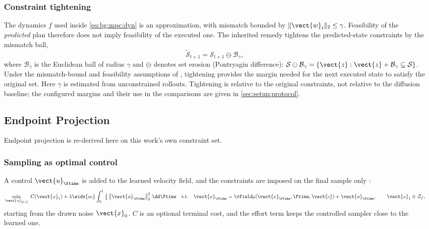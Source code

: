 \subsubsection*{Constraint tightening}

The dynamics $f$ used inside \eqref{eq:bg:mpc:dyn} is an approximation, with mismatch bounded
by $\|\vect{w}_{t}\|_{2}\le\gamma$. Feasibility of the \emph{predicted} plan therefore does not
imply feasibility of the executed one. The inherited remedy tightens the predicted-state
constraints by the mismatch ball,
\begin{equation}\label{eq:method:dpcc:tighten}
  \tilde{\mathcal{S}}_{t+1} = \mathcal{S}_{t+1}\ominus\mathcal{B}_{\gamma},
\end{equation}
where $\mathcal{B}_{\gamma}$ is the Euclidean ball of radius $\gamma$ and $\ominus$ denotes
set erosion (Pontryagin difference):
$\mathcal{S}\ominus\mathcal{B}_{\gamma}
=\{\vect{z}:\vect{z}+\mathcal{B}_{\gamma}\subseteq\mathcal{S}\}$.
Under the mismatch-bound and feasibility assumptions of
\parencite[Theorem~2]{romer2025diffusion}, tightening provides the margin needed for the next
executed state to satisfy the original set. Here $\gamma$ is estimated from unconstrained rollouts.
Tightening is relative to the original constraints, not relative to the diffusion baseline; the
configured margins and their use in the comparisons are given in \autoref{sec:setup:protocol}.

\subsection{Endpoint Projection}\label{sec:method:hardflow}

Endpoint projection \parencite{li2025hardflow} is re-derived here on this work's own constraint set.

\subsubsection*{Sampling as optimal control}

A control $\vect{u}_{\ftime}$ is added to the learned velocity field, and the constraints are imposed on
the final sample only \parencite[Problem~1]{li2025hardflow}:
\begin{equation}\label{eq:method:hf:oc}
  \min_{\vect{u}_{[0,1]}}\; C(\vect{x}_{1})
    + \lambda\sidx{oc}\int_{0}^{1}\tfrac{1}{2}\left\|\vect{u}_{\ftime}\right\|_{2}^{2}\,\dd\ftime
  \quad\text{s.t.}\quad
  \dot{\vect{x}}_{\ftime} = \vfield_{\theta}(\vect{x}_{\ftime},\ftime,\vect{c}) + \vect{u}_{\ftime},
  \qquad \vect{x}_{1}\in\mathcal{Z}_{f},
\end{equation}
starting from the drawn noise $\vect{x}_{0}$. $C$ is an optional terminal cost, and the effort term keeps
the controlled sampler close to the learned one.


